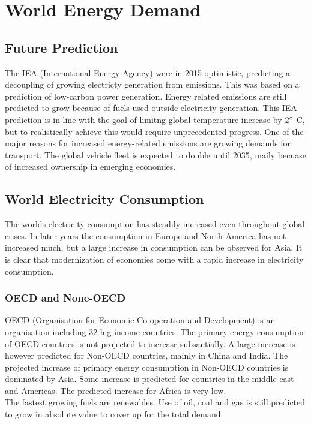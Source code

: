 \section{World Energy Demand}

\subsection{Future Prediction}
The IEA (International Energy Agency) were in 2015 optimistic, predicting a decoupling of growing electricty generation from \cotwo emissions.
This was based on a prediction of low-carbon power generation.
Energy related \cotwo emissions are still predicted to grow because of fuels used outside electricity generation.
This IEA prediction is in line with the goal of limitng global temperature increase by $2\degree$ C, but to realistically achieve this would require unprecedented progress.
One of the major reasons for increased energy-related \cotwo emissions are growing demands for transport.
The global vehicle fleet is expected to double until 2035, maily becuase of increased ownership in emerging economies.

\subsection{World Electricity Consumption}
The worlds electricity consumption has steadily increased even throughout global crises.
In later years the consumption in Europe and North America has not increased much, but a large increase in consumption can be observed for Asia.
It is clear that modernization of economies come with a rapid increase in electricity consumption.

\subsubsection{OECD and None-OECD}
OECD (Organisation for Economic Co-operation and Development) is an organisation including 32 hig income countries.
The primary energy consumption of OECD countries is not projected to increase subsantially.
A large increase is however predicted for Non-OECD countries, mainly in China and India.
The projected increase of primary energy consumption in Non-OECD countries is dominated by Asia.
Some increase is predicted for countries in the middle east and Americas.
The predicted increase for Africa is very low.\\

The fastest growing fuels are renewables.
Use of oil, coal and gas is still predicted to grow in absolute value to cover up for the total demand.

